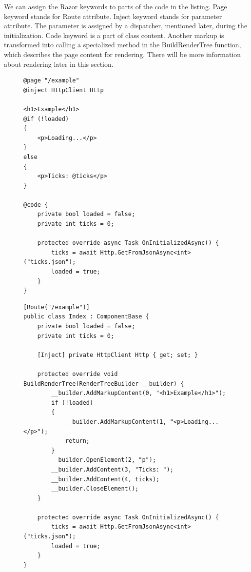 We can assign the Razor keywords to parts of the code in the listing.
Page keyword stands for Route attribute.
Inject keyword stands for parameter attribute. The parameter is assigned by a dispatcher, mentioned later, during the initialization.
Code keyword is a part of class content.
Another markup is transformed into calling a specialized method in the BuildRenderTree function, which describes the page content for rendering. 
There will be more information about rendering later in this section.
\par
\begin{figure}
\begin{minipage}[c]{0.95\textwidth}
\begin{lstlisting}[basicstyle=\small, caption=Example of Razor page., label={lst:razorpage}]
@page "/example"
@inject HttpClient Http

<h1>Example</h1>
@if (!loaded)
{
    <p>Loading...</p>
}
else
{
    <p>Ticks: @ticks</p>
}

@code {
    private bool loaded = false;
    private int ticks = 0;

    protected override async Task OnInitializedAsync() {
        ticks = await Http.GetFromJsonAsync<int>("ticks.json");
        loaded = true;
    }
}
\end{lstlisting}
\end{minipage}
\begin{minipage}[c]{0.95\textwidth}
\begin{lstlisting}[basicstyle=\small, caption=Razor page generated to the C\# class., label={lst:component}]
[Route("/example")]
public class Index : ComponentBase {
	private bool loaded = false;
	private int ticks = 0;
	
	[Inject] private HttpClient Http { get; set; }

	protected override void BuildRenderTree(RenderTreeBuilder __builder) {
		__builder.AddMarkupContent(0, "<h1>Example</h1>");
		if (!loaded)
		{
			__builder.AddMarkupContent(1, "<p>Loading...</p>");
			return;
		}
		__builder.OpenElement(2, "p");
		__builder.AddContent(3, "Ticks: ");
		__builder.AddContent(4, ticks);
		__builder.CloseElement();
	}

	protected override async Task OnInitializedAsync() {
		ticks = await Http.GetFromJsonAsync<int>("ticks.json");
		loaded = true;
	}
}
\end{lstlisting}
\end{minipage}
\end{figure}
\par
